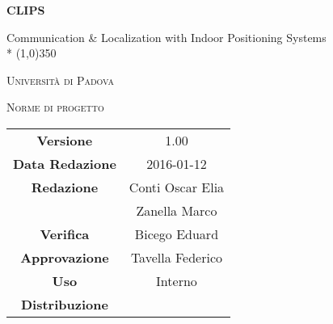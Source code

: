 \documentclass[a4paper,12pt]{article}
\author{Conti Oscar Elia, Zanella Marco}
\date{24/12/2015}
\begin{document}
\begin{titlepage}
	\centering
	{\huge\bfseries CLIPS\par}
	Communication \& Localization with Indoor Positioning Systems \\*
	\line(1,0){350} \\
	{\scshape\LARGE Università di Padova \par}
	\vspace{1cm}
	{\scshape\Large Norme di progetto \par}
	\logo
	\newpage
		\begin{tabular}{c|c}
			{\hfill \textbf{Versione}} 			& 1.00			\\
			{\hfill\textbf{Data Redazione}} 		& 2016-01-12  		\\ 
			{\hfill\textbf{Redazione}} 			&  Conti Oscar Elia \\ 
											&  Zanella Marco       \\
			{\hfill\textbf{Verifica}} 				&  Bicego Eduard   \\
			{\hfill\textbf{Approvazione}} 		&  Tavella Federico\\
			{\hfill\textbf{Uso}} 					& Interno			\\
			{\hfill\textbf{Distribuzione}} 			& \leaf			\\
		\end{tabular}
	\end{titlepage}
	\newpage
	\pagestyle{myfront}
	
	\newpage
	\tableofcontents	
	\label{LastFrontPage}
	\newpage
	\pagestyle{mymain}
         
         	\newpage
		

	\newpage
		
	
	\newpage
		
	
	\newpage
		
		
	\label{LastPage}
\end{document}
